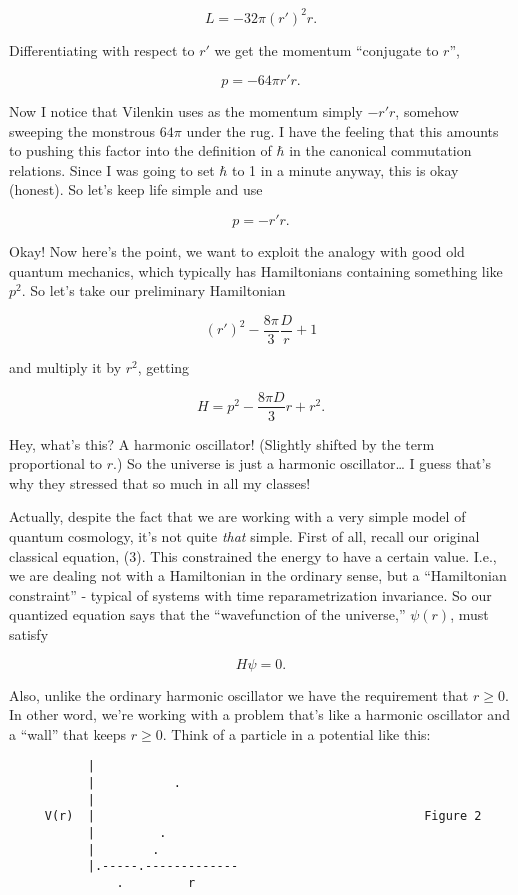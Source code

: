 \documentclass{article}
\begin{document}
\[L = -32\pi (r')^2 r.\]

Differentiating with respect to \(r'\) we get the momentum ``conjugate
to \(r\)'',

\[p = -64\pi r'r.\]

Now I notice that Vilenkin uses as the momentum simply \(-r'r\), somehow
sweeping the monstrous \(64\pi\) under the rug. I have the feeling that
this amounts to pushing this factor into the definition of \(\hbar\) in
the canonical commutation relations. Since I was going to set \(\hbar\)
to 1 in a minute anyway, this is okay (honest). So let's keep life
simple and use

\[p = -r'r.\]

Okay! Now here's the point, we want to exploit the analogy with good old
quantum mechanics, which typically has Hamiltonians containing something
like \(p^2\). So let's take our preliminary Hamiltonian

\[(r')^2 - \frac{8\pi}{3} \frac{D}{r} + 1\]

and multiply it by \(r^2\), getting

\[H = p^2 - \frac{8\pi D}{3}r + r^2.\]

Hey, what's this? A harmonic oscillator! (Slightly shifted by the term
proportional to \(r\).) So the universe is just a harmonic
oscillator\ldots{} I guess that's why they stressed that so much in all
my classes!

Actually, despite the fact that we are working with a very simple model
of quantum cosmology, it's not quite \emph{that} simple. First of all,
recall our original classical equation, (3). This constrained the energy
to have a certain value. I.e., we are dealing not with a Hamiltonian in
the ordinary sense, but a ``Hamiltonian constraint'' - typical of
systems with time reparametrization invariance. So our quantized
equation says that the ``wavefunction of the universe,'' \(\psi(r)\),
must satisfy

\[H \psi = 0.\]

Also, unlike the ordinary harmonic oscillator we have the requirement
that \(r\geqslant0\). In other word, we're working with a problem that's
like a harmonic oscillator and a ``wall'' that keeps \(r\geqslant0\).
Think of a particle in a potential like this:

\begin{verbatim}
           |
           |           .   
           |                           
     V(r)  |                                              Figure 2 
           |         .                                
           |        .                                 
           |.-----.-------------
               .         r 
\end{verbatim}
\end{document}
